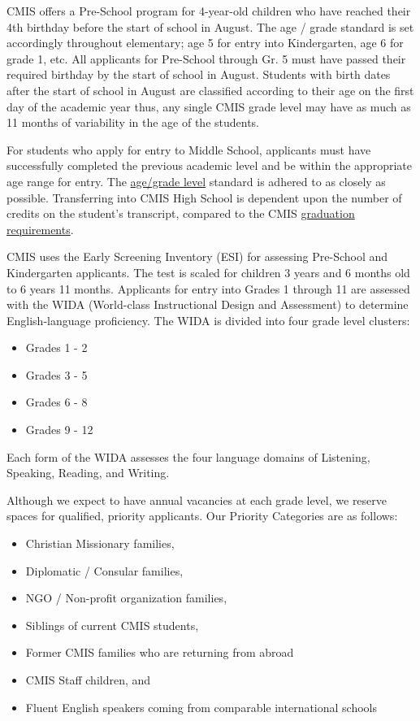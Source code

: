 
CMIS offers a Pre-School program for 4-year-old children who have reached their 4th birthday before the start of school in August.  The age / grade standard is set accordingly throughout elementary; age 5 for entry into Kindergarten, age 6 for grade 1, etc.  All applicants for Pre-School through Gr. 5 must have passed their required birthday by the start of school in August.  Students with birth dates after the start of school in August are classified according to their age on the first day of the academic year thus, any single CMIS grade level may have as much as 11 months of variability in the age of the students.  

For students who apply for entry to Middle School, applicants must have successfully completed the previous academic level and be within the appropriate age range for entry.  The \href{http://cmis.ac.th/admissions}{age/grade level} standard is adhered to as closely as possible.  Transferring into CMIS High School is dependent upon the number of credits on the student's transcript, compared to the CMIS \href{http://cmis.ac.th/programs/high_school}{graduation requirements}.


CMIS uses the Early Screening Inventory (ESI) for assessing Pre-School and Kindergarten applicants.  The test is scaled for children 3 years and 6 months old to 6 years 11 months.  Applicants for entry into Grades 1 through 11 are assessed with the WIDA (World-class Instructional Design and Assessment) to determine English-language proficiency.  The WIDA is divided into four grade level clusters:

\begin{itemize}
\item Grades 1 - 2
\item Grades 3 - 5
\item Grades 6 - 8
\item Grades 9 - 12
\end{itemize}


Each form of the WIDA assesses the four language domains of Listening, Speaking, Reading, and Writing.  


Although we expect to have annual vacancies at each grade level, we reserve spaces for qualified, priority applicants.  Our Priority Categories are as follows:  
\begin{itemize}
\item Christian Missionary families,
\item Diplomatic / Consular families,
\item NGO / Non-profit organization families,
\item Siblings of current CMIS students,
\item Former CMIS families who are returning from abroad
\item CMIS Staff children, and
\item Fluent English speakers coming from comparable international schools
\end{itemize}

